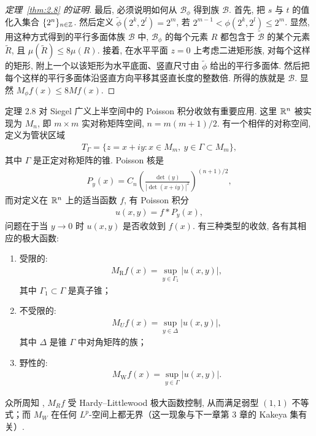 \begin{proof}[定理~\ref{thm:2.8} 的证明]
最后, 必须说明如何从 $\mathcal{B}_\phi$ 得到族 $\mathcal{B}$. 首先, 把 $s$ 与 $t$ 的值化入集合 $\{2^n\}_{n\in\mathbb{Z}}$. 然后定义 $\tilde{\phi}(2^k, 2^l) = 2^m$, 若 $2^{m-1} < \phi(2^k, 2^l) \leq 2^m$. 显然, 用这种方式得到的平行多面体族 $\mathcal{B}$ 中, $\mathcal{B}_\phi$ 的每个元素 $R$ 都包含于 $\tilde{\mathcal{B}}$ 的某个元素 $\tilde{R}$, 且 $\mu(\tilde{R}) \leq 8\mu(R)$. 接着, 在水平平面 $z = 0$ 上考虑二进矩形族, 对每个这样的矩形, 附上一个以该矩形为水平底面、竖直尺寸由 $\tilde{\phi}$ 给出的平行多面体. 然后把每个这样的平行多面体沿竖直方向平移其竖直长度的整数倍. 所得的族就是 $\mathcal{B}$. 显然 $M_\phi f(x) \leq 8M f(x)$.
\end{proof}

定理 2.8 对 Siegel 广义上半空间中的 Poisson 积分收敛有重要应用. 这里 $\mathbb{R}^n$ 被实现为 $M_n$, 即 $m \times m$ 实对称矩阵空间, $n = m(m+1)/2$. 有一个相伴的对称空间, 定义为管状区域
\begin{align*}
  T_{\Gamma}=\{z=x+i y:x\in M_{m},\ y\in\Gamma\subset M_{m}\},
\end{align*}
其中 $\Gamma$ 是正定对称矩阵的锥. Poisson 核是
\begin{align*}
  P_{y}(x)=C_{n}\left(\frac{\det(y)}{|\det(x+i y)|^{2}}\right)^{(n+1)/2},
\end{align*}
而对定义在 $\mathbb{R}^n$ 上的适当函数 $f$, 有 Poisson 积分
\begin{align*}
  u(x,y)=f*P_{y}(x),
\end{align*}
问题在于当 $y \to 0$ 时 $u(x, y)$ 是否收敛到 $f(x)$. 有三种类型的收敛, 各有其相应的极大函数:

\begin{enumerate}
\item[(a)] 受限的:
\begin{align*}
  M_{\mathrm{R}}f(x)=\sup_{y\in\Gamma_{1}}|u(x,y)|,
\end{align*}
其中 $\Gamma_1 \subset \Gamma$ 是真子锥；

\item[(b)] 不受限的:
\begin{align*}
  M_{U}f(x)=\sup_{y\in\Delta}|u(x,y)|,
\end{align*}
其中 $\Delta$ 是锥 $\Gamma$ 中对角矩阵的族；

\item[(c)] 野性的:
\begin{align*}
  M_{\mathrm{W}}f(x)=\sup_{y\in\Gamma}|u(x,y)|.
\end{align*}
\end{enumerate}

众所周知 \cite{b54}, $M_R f$ 受 Hardy--Littlewood 极大函数控制, 从而满足弱型 $(1, 1)$ 不等式；而 $M_W$ 在任何 $L^p$-空间上都无界（这一现象与下一章第 3 章的 Kakeya 集有关）.

